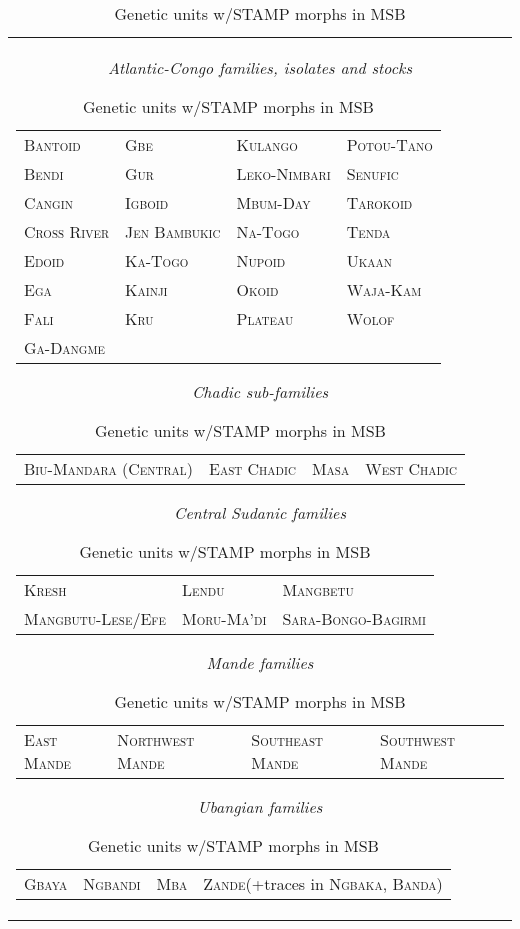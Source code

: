 \documentclass[output=paper]{langsci/langscibook}
\begin{document}
\begin{table} 
\caption{Genetic units w/STAMP morphs in MSB \citep{Anderson2011, Dimmendaal2008, Dimmendaal2011, Sands2009}}
\label{tab:Anderson:2}
\centering
\begin{tabular}{c}
\lsptoprule
\parbox{.9\textwidth}{
\textit{Atlantic-Congo families, isolates and stocks}\\
\begin{tabular}{llll}
\textsc{Bantoid} & \textsc{Gbe} & \textsc{Kulango} & \textsc{Potou-Tano}\\
\textsc{Bendi} & \textsc{Gur} & \textsc{Leko-Nimbari} & \textsc{Senufic}\\
\textsc{Cangin} & \textsc{Igboid} & \textsc{Mbum-Day} & \textsc{Tarokoid}\\
\textsc{Cross River} & \textsc{Jen Bambukic} & \textsc{Na-Togo} & \textsc{Tenda}\\
\textsc{Edoid} & \textsc{Ka-Togo} & \textsc{Nupoid} & \textsc{Ukaan}\\
\textsc{Ega} & \textsc{Kainji} & \textsc{Okoid} & \textsc{Waja-Kam}\\
\textsc{Fali} & \textsc{Kru} & \textsc{Plateau} & \textsc{Wolof} \\
\textsc{Ga-Dangme} &  & & \\
\end{tabular}

\bigskip

\textit{Chadic sub-families}\\
\begin{tabular}{llll}
\textsc{Biu-Mandara (Central)} & \textsc{East Chadic} & \textsc{Masa} & \textsc{West Chadic}\\
\end{tabular}

\bigskip

\textit{Central Sudanic families}\\
\begin{tabular}{lll}
\textsc{Kresh} & \textsc{Lendu} & \textsc{Mangbetu}\\
\textsc{Mangbutu-Lese/Efe} & \textsc{Moru-Ma'di} & \textsc{Sara-Bongo-Bagirmi}\\
\end{tabular}

\bigskip


\textit{Mande families}\\
\begin{tabular}{llll}
\textsc{East Mande} &  \textsc{Northwest Mande} & \textsc{Southeast Mande} & \textsc{Southwest Mande}
\end{tabular}

\bigskip


\textit{Ubangian families}\\
\begin{tabular}{llll}
\textsc{Gbaya} & \textsc{Ngbandi} & \textsc{Mba} & \textsc{Zande}(+traces in \textsc{Ngbaka, Banda)}\\
\end{tabular}
}
\\
\lspbottomrule
\end{tabular}
\end{table}
\end{document}
